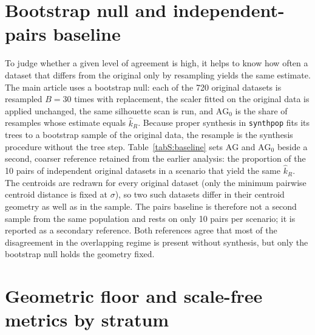 \documentclass[pdflatex,referee]{sn-jnl}
\begin{document}
\section{Bootstrap null and independent-pairs baseline}
\label{sec:null}

To judge whether a given level of agreement is high, it helps to know how
often a dataset that differs from the original only by resampling yields the
same estimate. The main article uses a bootstrap null: each of the 720 original
datasets is resampled $B = 30$ times with replacement, the scaler fitted on
the original data is applied unchanged, the same silhouette scan is run, and
$\mathrm{AG}_0$ is the share of resamples whose estimate equals $\hat{k}_R$.
Because proper synthesis in \texttt{synthpop} fits its trees to a bootstrap
sample of the original data, the resample is the synthesis procedure without
the tree step. Table~\ref{tabS:baseline} sets $\mathrm{AG}$ and
$\mathrm{AG}_0$ beside a second, coarser reference retained from the earlier
analysis: the proportion of the 10 pairs of independent original datasets in
a scenario that yield the same $\hat{k}_R$. The centroids are redrawn for
every original dataset (only the minimum pairwise centroid distance is fixed
at $\sigma$), so two such datasets differ in their centroid geometry as well
as in the sample. The pairs baseline is therefore not a second sample from the
same population and rests on only 10 pairs per scenario; it is reported as a
secondary reference. Both references agree that most of the disagreement in
the overlapping regime is present without synthesis, but only the bootstrap
null holds the geometry fixed.

\begin{table}[!htbp]
\centering
\caption{Synthetic-versus-original agreement (AG), the bootstrap null
  ($\mathrm{AG}_0$, $B = 30$ resamples per original dataset) and the
  independent-pairs baseline (Pairs: proportion of pairs of independent
  original datasets in the same scenario with equal $\hat{k}_R$, which also
  differ in centroid geometry). Means over scenarios; candidate range
  $\{2,\dots,8\}$.}
\label{tabS:baseline}
\small

\end{table}

\section{Geometric floor and scale-free metrics by stratum}
\label{sec:floor}
\end{document}
